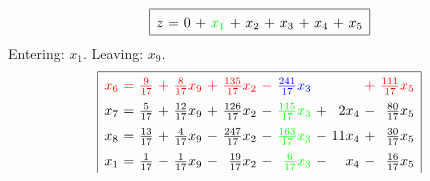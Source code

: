 \documentclass[11pt]{article}
\begin{document}
\begin{equation*}
\begin{array}{|rcrcrcrcrcrcr|}
\hline
z \mspace{-6mu}&\mspace{-6mu} = \mspace{-6mu}&\mspace{-6mu} 0 \mspace{-6mu}&\mspace{-6mu} + \mspace{-6mu}&\color{green}\mspace{-6mu} x_{1} \mspace{-6mu}&\mspace{-6mu} + \mspace{-6mu}&\mspace{-6mu} x_{2} \mspace{-6mu}&\mspace{-6mu} + \mspace{-6mu}&\mspace{-6mu} x_{3} \mspace{-6mu}&\mspace{-6mu} + \mspace{-6mu}&\mspace{-6mu} x_{4} \mspace{-6mu}&\mspace{-6mu} + \mspace{-6mu}&\mspace{-6mu} x_{5}\\
\hline
\end{array}
\end{equation*}
Entering: $x_{1}$. Leaving: $x_{9}$. 
\begin{equation*}
\renewcommand{\arraystretch}{1.5} %
\begin{array}{|rcrcrcrcrcrcr|}
\hline
\color{red}x_{6} \mspace{-6mu}&\color{red}\mspace{-6mu} = \mspace{-6mu}&\color{red}\mspace{-6mu} \frac{9}{17} \mspace{-6mu}&\color{red}\mspace{-6mu} + \mspace{-6mu}&\color{red}\mspace{-6mu} \frac{8}{17} x_{9} \mspace{-6mu}&\color{red}\mspace{-6mu} + \mspace{-6mu}&\color{red}\mspace{-6mu} \frac{135}{17} x_{2} \mspace{-6mu}&\color{red}\mspace{-6mu} - \mspace{-6mu}&\color{blue}\mspace{-6mu} \frac{241}{17} x_{3} \mspace{-6mu}&\color{red}\mspace{-6mu}  \mspace{-6mu}&\color{red}\mspace{-6mu}  \mspace{-6mu}&\color{red}\mspace{-6mu} + \mspace{-6mu}&\color{red}\mspace{-6mu} \frac{111}{17} x_{5}\\
x_{7} \mspace{-6mu}&\mspace{-6mu} = \mspace{-6mu}&\mspace{-6mu} \frac{5}{17} \mspace{-6mu}&\mspace{-6mu} + \mspace{-6mu}&\mspace{-6mu} \frac{12}{17} x_{9} \mspace{-6mu}&\mspace{-6mu} + \mspace{-6mu}&\mspace{-6mu} \frac{126}{17} x_{2} \mspace{-6mu}&\mspace{-6mu} - \mspace{-6mu}&\color{green}\mspace{-6mu} \frac{115}{17} x_{3} \mspace{-6mu}&\mspace{-6mu} + \mspace{-6mu}&\mspace{-6mu} 2 x_{4} \mspace{-6mu}&\mspace{-6mu} - \mspace{-6mu}&\mspace{-6mu} \frac{80}{17} x_{5}\\
x_{8} \mspace{-6mu}&\mspace{-6mu} = \mspace{-6mu}&\mspace{-6mu} \frac{13}{17} \mspace{-6mu}&\mspace{-6mu} + \mspace{-6mu}&\mspace{-6mu} \frac{4}{17} x_{9} \mspace{-6mu}&\mspace{-6mu} - \mspace{-6mu}&\mspace{-6mu} \frac{247}{17} x_{2} \mspace{-6mu}&\mspace{-6mu} - \mspace{-6mu}&\color{green}\mspace{-6mu} \frac{163}{17} x_{3} \mspace{-6mu}&\mspace{-6mu} - \mspace{-6mu}&\mspace{-6mu} 11 x_{4} \mspace{-6mu}&\mspace{-6mu} + \mspace{-6mu}&\mspace{-6mu} \frac{30}{17} x_{5}\\
x_{1} \mspace{-6mu}&\mspace{-6mu} = \mspace{-6mu}&\mspace{-6mu} \frac{1}{17} \mspace{-6mu}&\mspace{-6mu} - \mspace{-6mu}&\mspace{-6mu} \frac{1}{17} x_{9} \mspace{-6mu}&\mspace{-6mu} - \mspace{-6mu}&\mspace{-6mu} \frac{19}{17} x_{2} \mspace{-6mu}&\mspace{-6mu} - \mspace{-6mu}&\color{green}\mspace{-6mu} \frac{6}{17} x_{3} \mspace{-6mu}&\mspace{-6mu} - \mspace{-6mu}&\mspace{-6mu} x_{4} \mspace{-6mu}&\mspace{-6mu} - \mspace{-6mu}&\mspace{-6mu} \frac{16}{17} x_{5}\\

\end{array}
\end{equation*}
\end{document}
